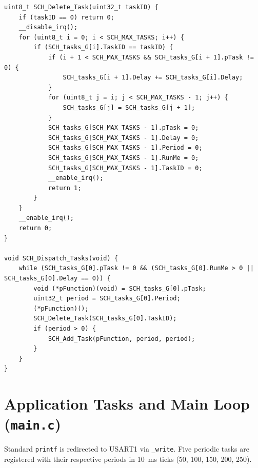\documentclass[12pt,a4paper]{article}
\begin{document}
\begin{lstlisting}[caption={\texttt{scheduler.c}}]
uint8_t SCH_Delete_Task(uint32_t taskID) {
    if (taskID == 0) return 0;
    __disable_irq();
    for (uint8_t i = 0; i < SCH_MAX_TASKS; i++) {
        if (SCH_tasks_G[i].TaskID == taskID) {
            if (i + 1 < SCH_MAX_TASKS && SCH_tasks_G[i + 1].pTask != 0) {
                SCH_tasks_G[i + 1].Delay += SCH_tasks_G[i].Delay;
            }
            for (uint8_t j = i; j < SCH_MAX_TASKS - 1; j++) {
                SCH_tasks_G[j] = SCH_tasks_G[j + 1];
            }
            SCH_tasks_G[SCH_MAX_TASKS - 1].pTask = 0;
            SCH_tasks_G[SCH_MAX_TASKS - 1].Delay = 0;
            SCH_tasks_G[SCH_MAX_TASKS - 1].Period = 0;
            SCH_tasks_G[SCH_MAX_TASKS - 1].RunMe = 0;
            SCH_tasks_G[SCH_MAX_TASKS - 1].TaskID = 0;
            __enable_irq();
            return 1;
        }
    }
    __enable_irq();
    return 0;
}

void SCH_Dispatch_Tasks(void) {
    while (SCH_tasks_G[0].pTask != 0 && (SCH_tasks_G[0].RunMe > 0 || SCH_tasks_G[0].Delay == 0)) {
        void (*pFunction)(void) = SCH_tasks_G[0].pTask;
        uint32_t period = SCH_tasks_G[0].Period;
        (*pFunction)();
        SCH_Delete_Task(SCH_tasks_G[0].TaskID);
        if (period > 0) {
            SCH_Add_Task(pFunction, period, period);
        }
    }
}
\end{lstlisting}

\newpage

\section{Application Tasks and Main Loop (\texttt{main.c})}

Standard \texttt{printf} is redirected to USART1 via \texttt{\_write}. Five periodic tasks are registered with their respective periods in 10~ms ticks (50, 100, 150, 200, 250).
\end{document}
